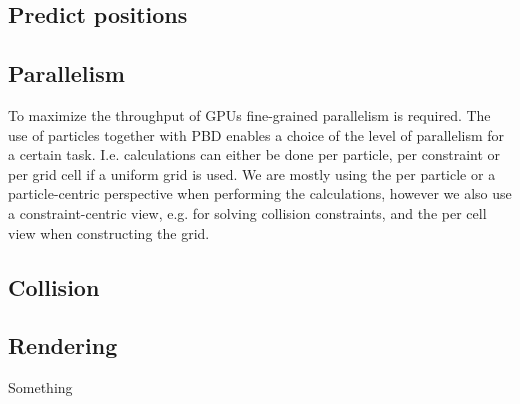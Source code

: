 

\subsection{Predict positions}


\subsection{Parallelism} To maximize the throughput of GPUs fine-grained
parallelism is required. The use of particles together with PBD enables a
choice of the level of parallelism for a certain task. I.e. calculations can
either be done per particle, per constraint or per grid cell if a uniform grid
is used. We are mostly using the per particle or a particle-centric perspective
when performing the calculations, however we also use a constraint-centric
view, e.g. for solving collision constraints, and the per cell view when
constructing the grid.

\subsection{Collision}


\subsection{Rendering}

Something \cite{van2009screen}
